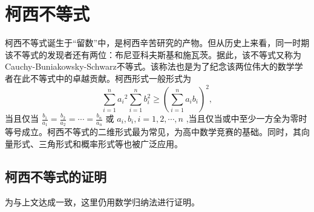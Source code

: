 \chapter{柯西不等式}


柯西不等式诞生于“留数”中，是柯西辛苦研究的产物。但从历史上来看，同一时期该不等式的发现者还有两位：布尼亚科夫斯基和施瓦茨。据此，该不等式又称为Cauchy-Buniakowsky-Schwarz不等式。该称法也是为了纪念该两位伟大的数学学者在此不等式中的卓越贡献。柯西形式一般形式为 \[\sum_{i=1}^{n} a_{i}{ }^{2} \sum_{i=1}^{n} b_{i}^{2} \geq\left(\sum_{i=1}^{n} a_{i} b_{i}\right)^{2},\] 当且仅当 $\frac{b_{1}}{a_{1}}=\frac{b_{2}}{a_{2}}=\cdots=\frac{b_{n}}{a_{n}}$ 或 $a_{i},  b_{i},i=1,2, \cdots, n$ ,当且仅当或中至少一方全为零时等号成立。柯西不等式的二维形式最为常见，为高中数学竞赛的基础。同时，其向量形式、三角形式和概率形式等也被广泛应用\cite{李梦2019数学竞赛中柯西不等式的教学研究}。


\section{柯西不等式的证明}

为与上文达成一致，这里仍用数学归纳法进行证明。

